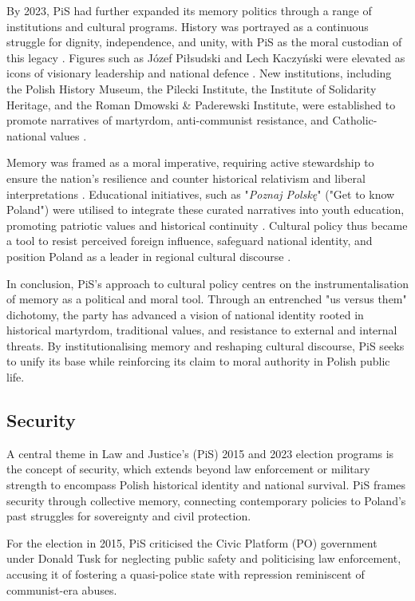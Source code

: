 By 2023, PiS had further expanded its memory politics through a range of institutions and cultural programs. History was portrayed as a continuous struggle for dignity, independence, and unity, with PiS as the moral custodian of this legacy \citep{pis_program_2023}. Figures such as Józef Piłsudski and Lech Kaczyński were elevated as icons of visionary leadership and national defence \citep{pis_program_2023}. New institutions, including the Polish History Museum, the Pilecki Institute, the Institute of Solidarity Heritage, and the Roman Dmowski \& Paderewski Institute, were established to promote narratives of martyrdom, anti-communist resistance, and Catholic-national values \citep{pis_program_2023}.

Memory was framed as a moral imperative, requiring active stewardship to ensure the nation's resilience and counter historical relativism and liberal interpretations \citep{pis_program_2023}. Educational initiatives, such as "\textit{Poznaj Polskę}" ("Get to know Poland") were utilised to integrate these curated narratives into youth education, promoting patriotic values and historical continuity \citep{pis_program_2023}. Cultural policy thus became a tool to resist perceived foreign influence, safeguard national identity, and position Poland as a leader in regional cultural discourse \citep{pis_program_2023}.

 In conclusion, PiS's approach to cultural policy centres on the instrumentalisation of memory as a political and moral tool. Through an entrenched "us versus them" dichotomy, the party has advanced a vision of national identity rooted in historical martyrdom, traditional values, and resistance to external and internal threats. By institutionalising memory and reshaping cultural discourse, PiS seeks to unify its base while reinforcing its claim to moral authority in Polish public life.


\subsection{Security}

A central theme in Law and Justice's (PiS) 2015 and 2023 election programs is the concept of security, which extends beyond law enforcement or military strength to encompass Polish historical identity and national survival. PiS frames security through collective memory, connecting contemporary policies to Poland's past struggles for sovereignty and civil protection.

For the election in 2015, PiS criticised the Civic Platform (PO) government under Donald Tusk for neglecting public safety and politicising law enforcement, accusing it of fostering a quasi-police state with repression reminiscent of communist-era abuses.


